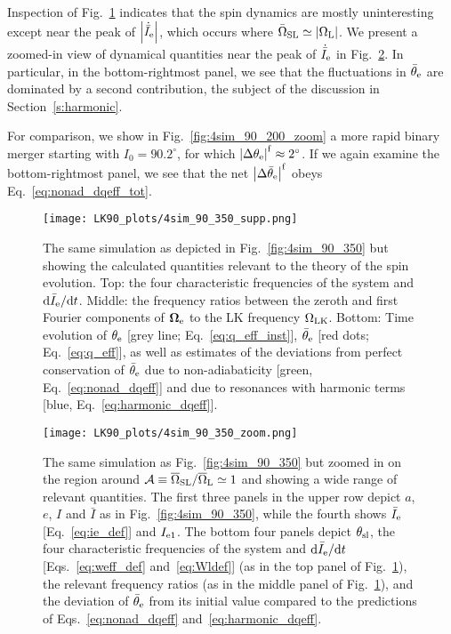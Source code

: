 \documentclass[
        twocolumn,
        twocolappendix
    ]{aastex63}
\newcommand*{\rdil}[2]{\mathrm{d}#1 / \mathrm{d}#2}
\newcommand*{\abs}[1]{\left|#1\right|}
\renewcommand*{\bm}[1]{\boldsymbol{\mathbf{#1}}}
\begin{document}
Inspection of Fig.~\ref{fig:4sim_90_350_supp} indicates that the spin dynamics
are mostly uninteresting except near the peak of $\abs{\dot{\bar{I}}_{\rm e}}$,
which occurs where $\bar{\Omega}_{\rm SL} \simeq \abs{\Omega_{\rm L}}$. We
present a zoomed-in view of dynamical quantities near the peak of
$\dot{\bar{I}}_{\rm e}$ in Fig.~\ref{fig:4sim_90_350_zoom}. In particular, in
the bottom-rightmost panel, we see that the fluctuations in $\bar{\theta}_{\rm
e}$ are dominated by a second contribution, the subject of
the discussion in Section~\ref{s:harmonic}.

For comparison, we show in Fig.~\ref{fig:4sim_90_200_zoom} a more rapid
binary merger starting with $I_0 = 90.2^\circ$, for which $\abs{\Delta
\theta_{\rm e}}^{\rm f} \approx 2^\circ$. If we again examine the
bottom-rightmost panel, we see that the net $\abs{\Delta \bar{\theta}_{\rm
e}}^{\rm f}$ obeys Eq.~\eqref{eq:nonad_dqeff_tot}.

\begin{figure}
    \centering
    \texttt{[image: LK90\_plots/4sim\_90\_350\_supp.png]}
    \caption{The same simulation as depicted in Fig.~\ref{fig:4sim_90_350} but
    showing the calculated quantities relevant to the theory of the spin
    evolution. Top: the four characteristic frequencies of the
    system and $\rdil{\bar{I}_{\rm e}}{t}$. Middle: the frequency ratios between
    the zeroth and first Fourier components of $\bm{\Omega}_{\rm e}$ to the LK
    frequency $\Omega_{\rm LK}$. Bottom: Time evolution of $\theta_{\rm e}$
    [grey line; Eq.~\eqref{eq:q_eff_inst}], $\bar{\theta}_{\rm e}$ [red dots;
    Eq.~\eqref{eq:q_eff}], as well as estimates of the deviations from perfect
    conservation of $\bar{\theta}_{\rm e}$ due to non-adiabaticity [green,
    Eq.~\eqref{eq:nonad_dqeff}] and due to resonances with harmonic terms [blue,
    Eq.~\eqref{eq:harmonic_dqeff}].}\label{fig:4sim_90_350_supp}
\end{figure}
\begin{figure*}
    \centering
    \texttt{[image: LK90\_plots/4sim\_90\_350\_zoom.png]}
    \caption{The same simulation as Fig.~\ref{fig:4sim_90_350} but zoomed in on
    the region around $\mathcal{A} \equiv \overline{\Omega}_{\rm SL} /
    \overline{\Omega}_{\rm L} \simeq 1$ and showing a wide range of relevant
    quantities. The first three panels in the upper row depict $a$, $e$, $I$ and
    $\bar{I}$ as in Fig.~\ref{fig:4sim_90_350}, while the fourth shows
    $\bar{I}_{\rm e}$ [Eq.~\eqref{eq:ie_def}] and $I_{\rm e1}$. The bottom four
    panels depict $\theta_{\rm sl}$, the four characteristic frequencies of the
    system and $\rdil{\bar{I}_{\rm e}}{t}$ [Eqs.~\ref{eq:weff_def}
    and~\eqref{eq:Wldef}] (as in the top panel of
    Fig.~\ref{fig:4sim_90_350_supp}), the relevant frequency ratios (as in the
    middle panel of Fig.~\ref{fig:4sim_90_350_supp}), and the deviation of
    $\bar{\theta}_{\rm e}$ from its initial value compared to the predictions of
    Eqs.~\eqref{eq:nonad_dqeff}
    and~\eqref{eq:harmonic_dqeff}.}\label{fig:4sim_90_350_zoom}
\end{figure*}
\end{document}
